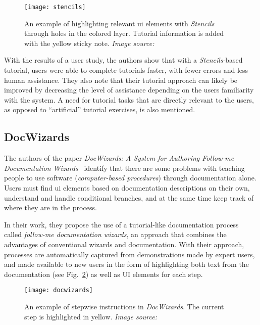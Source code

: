 \begin{figure}[htp]
	\centering
	\texttt{[image: stencils]}
	\caption[\emph{Stencils} example]{An example of highlighting relevant \gls{ui} elements with \emph{Stencils} through holes in the colored layer. Tutorial information is added with the yellow sticky note. \emph{Image source:~\cite{kelleher:stencils}}}
	\label{fig:stencils}
\end{figure}

\noindent
With the results of a user study, the authors show that with a \emph{Stencils}-based tutorial, users were able to complete tutorials faster, with fewer errors and less human assistance. They also note that their tutorial approach can likely be improved by decreasing the level of assistance depending on the users familiarity with the system. A need for tutorial tasks that are directly relevant to the users, as opposed to ``artificial'' tutorial exercises, is also mentioned.


\subsection{DocWizards}
\label{sec:docwizards}
The authors of the paper \emph{DocWizards: A System for Authoring Follow-me Documentation Wizards}~\cite{bergman:docwizards} identify that there are some problems with teaching people to use software (\emph{computer-based procedures}) through documentation alone. Users must find \gls{ui} elements based on documentation descriptions on their own, understand and handle conditional branches, and at the same time keep track of where they are in the process.

\noindent
In their work, they propose the use of a tutorial-like documentation process called \emph{follow-me documentation wizards}, an approach that combines the advantages of conventional wizards and documentation. With their approach, processes are automatically captured from demonstrations made by expert users, and made available to new users in the form of highlighting both text from the documentation (see Fig.~\ref{fig:docwizards}) as well as UI elements for each step.

\begin{figure}[htp]
	\centering
	\texttt{[image: docwizards]}
	\caption[\emph{DocWizards} example]{An example of stepwise instructions in \emph{DocWizards}. The current step is highlighted in yellow. \emph{Image source:~\cite{bergman:docwizards}}}
	\label{fig:docwizards}
\end{figure}

